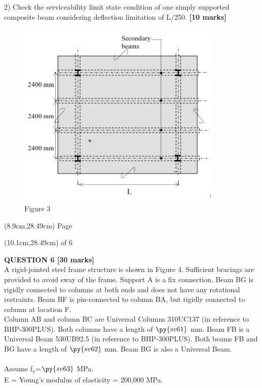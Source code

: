 \documentclass[a4paper,11pt]{article}
\begin{document}
2) Check the serviceability limit state condition of one simply supported composite beam considering deflection limitation of L/250. \textbf{[10 marks]}\\
\begin{figure}[ht]
\includegraphics[width=9.776cm, height=9cm]{Figure3.png}\\
\centering
Figure 3\\
\centering
\end{figure}
\begin{textblock*}{5cm}(8.9cm,28.49cm)
Page
\end{textblock*}
\begin{textblock*}{5cm}(10.1cm,28.49cm)
of 6
\end{textblock*}
\newpage
\noindent
\textbf{QUESTION 6 [30 marks]}\\
A rigid-jointed steel frame structure is shown in Figure 4. Sufficient bracings are provided to avoid sway of the frame. Support A is a fix connection. Beam BG is rigidly connected to columns at both ends and does not have any rotational restraints. Beam BF is pin-connected to column BA, but rigidly connected to column at location F.\\
Column AB and column BC are Universal Columns 310UC137 (in reference to BHP-300PLUS). Both columns have a length of $\py{sv61}$ mm. Beam FB is a Universal Beam 530UB92.5 (in reference to BHP-300PLUS). Both beams FB and BG have a length of $\py{sv62}$ mm. Beam BG is also a Universal Beam. \\
\\
Assume f\textsubscript{y}=$\py{sv63}$ MPa.\\
E = Young’s modulus of elasticity = 200,000 MPa.\\
\end{document}
